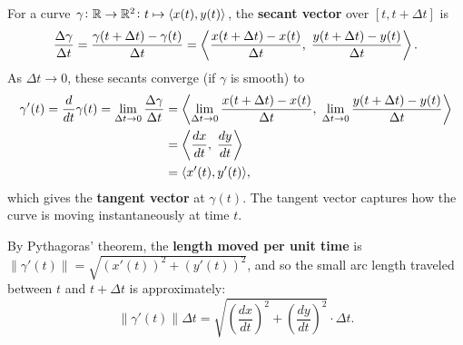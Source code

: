 \documentclass[11pt,openany]{article}
\renewcommand{\emph}[1]{\textbf{#1}}
\begin{document}
\begin{center}
	\endanimateinline
\end{center}
For a curve $\gamma\colon\mathbb{R}\to\mathbb{R}^2\colon t\mapsto\langle x(t),y(t) \rangle$, the \emph{secant vector} over $[t,t+\Delta t]$ is
\[
\frac{\Delta \gamma}{\Delta t}=\frac{\gamma(t+\Delta t)-\gamma(t)}{\Delta t}
= \left\langle \frac{x(t+\Delta t)-x(t)}{\Delta t},\;\frac{y(t+\Delta t)-y(t)}{\Delta t} \right\rangle.
\]
As $\Delta t \to 0$, these secants converge (if $\gamma$ is smooth) to \begin{align*}
\gamma'(t)=\frac{d}{dt}\gamma(t)= \lim_{\Delta t\to0}
\frac{\Delta\gamma}{\Delta t}&=\left\langle \lim_{\Delta t\to0}\frac{x(t+\Delta t)-x(t)}{\Delta t},\;\lim_{\Delta t\to0}\frac{y(t+\Delta t)-y(t)}{\Delta t} \right\rangle\\
&=\left\langle \frac{dx}{dt},\;\frac{dy}{dt} \right\rangle\\
&=\langle x'(t),y'(t) \rangle,
\end{align*} which gives the \emph{tangent vector} at $\gamma(t)$. The tangent vector captures how the curve is moving instantaneously at time $t$.\par
By Pythagoras’ theorem, the \emph{length moved per unit time} is \(\|\gamma'(t)\|=\sqrt{(x'(t))^2 + (y'(t))^2}\), and so the small arc length traveled between \(t\) and \(t+\Delta t\) is approximately: \[
\|\gamma'(t)\| \Delta t=\sqrt{\left(\frac{dx}{dt}\right)^2+\left(\frac{dy}{dt}\right)^2}\cdot\Delta t.
\]
\newpage
{}
\end{document}

